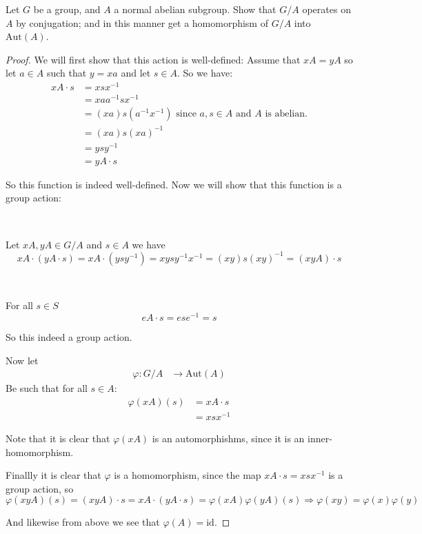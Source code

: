 \begin{exercise}
Let $G$ be a group, and $A$ a normal abelian subgroup. Show that $G/A$ operates on $A$ by conjugation; and in this manner get a homomorphism of $G/A$ into $\text{Aut}(A)$.
\begin{proof}
We will first show that this action is well-defined: Assume that $xA = yA$ so let $a\in A$ such that $y = xa$ and let $s\in A$. So we have:\begin{align*}
xA\cdot s &= xsx^{-1}\\
&= xaa^{-1}sx^{-1}\\
&= (xa)s(a^{-1}x^{-1}) \text{ since }a,s\in A\text{ and }A \text{ is abelian.}\\
&= (xa)s{(xa)}^{-1}\\
&= ysy^{-1}\\
&= yA\cdot s
\end{align*}  

So this function is indeed well-defined. Now we will show that this function is a group action:

\

Let $xA, yA\in G/A$ and $s\in A$ we have\begin{equation*}
xA\cdot (yA\cdot s) = xA\cdot (ysy^{-1}) = xysy^{-1}x^{-1} = (xy)s{(xy)}^{-1} = (xyA)\cdot s
\end{equation*}

\

For all $s\in S$\begin{equation*}
eA\cdot s = ese^{-1} = s
\end{equation*}

So this indeed a group action.

Now let \begin{align*}
\varphi\colon G/A &\rightarrow \text{Aut}(A)
\end{align*}
Be such that for all $s\in A$: \begin{align*}
\varphi(xA)(s) &= xA\cdot s\\
&= xsx^{-1}
\end{align*}

Note that it is clear that $\varphi(xA)$ is an automorphishms, since it is an inner-homomorphism.

Finallly it is clear that $\varphi$ is a homomorphism, since the map $xA\cdot s = xsx^{-1}$ is a group action, so \[\varphi(xyA)(s) = (xyA)\cdot s = xA\cdot (yA\cdot s) = \varphi(xA)\varphi(yA)(s) \Rightarrow \varphi(xy)=\varphi(x)\varphi(y)\]

And likewise from above we see that $\varphi(A) = \text{id}$.
\end{proof}
\end{exercise}
